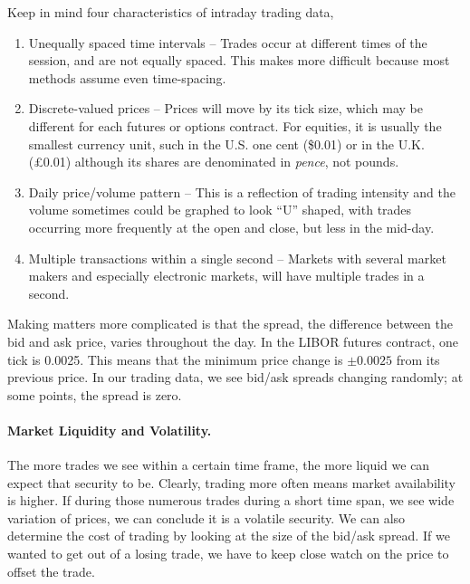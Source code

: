 Keep in mind four characteristics of intraday trading data,
\begin{enumerate}
\item Unequally spaced time intervals -- Trades occur at different times of the session, and are not equally spaced. This makes \fts{} more difficult because most methods assume even time-spacing.
\item Discrete-valued prices -- Prices will move by its tick size, which may be different for each futures or options contract. For equities, it is usually the smallest currency unit, such in the U.S. one cent (\$0.01) or in the U.K. (\pounds0.01) although its shares are denominated in \emph{pence}, not pounds.
\item Daily price/volume pattern -- This is a reflection of trading intensity and the volume sometimes could be graphed to look ``U'' shaped, with trades occurring more frequently at the open and close, but less in the mid-day.
\item Multiple transactions within a single second -- Markets with several market makers and especially electronic markets, will have multiple trades in a second.
\end{enumerate}

Making matters more complicated is that the spread, the difference between the bid and ask price, varies throughout the day. In the LIBOR futures contract, one tick is 0.0025. This means that the minimum price change is $\pm 0.0025$ from its previous price. In our trading data, we see bid/ask spreads changing randomly; at some points, the spread is zero. 

\paragraph{Market Liquidity and Volatility.} The more trades we see within a certain time frame, the more liquid we can expect that security to be. Clearly, trading more often means market availability is higher. If during those numerous trades during a short time span, we see wide variation of prices, we can conclude it is a volatile security. We can also determine the cost of trading by looking at the size of the bid/ask spread. If we wanted to get out of a losing trade, we have to keep close watch on the price to offset the trade.

